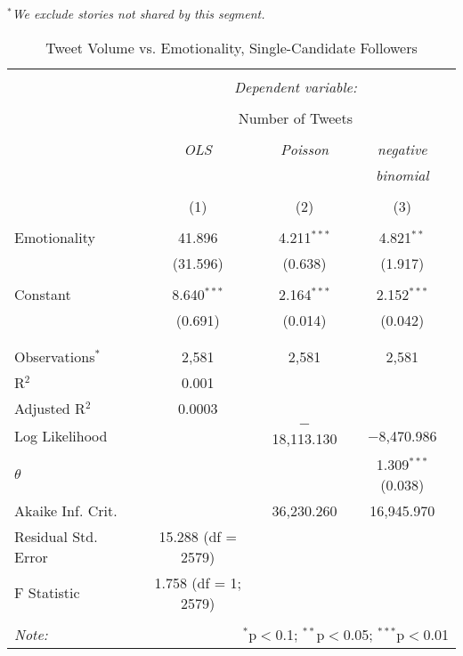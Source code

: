 \emph{$^{*}$We exclude stories not shared by this segment.} 
\newpage 
\begin{table}[!htbp] \centering 
  \caption{Tweet Volume vs. Emotionality, Single-Candidate Followers} 
  \label{} 
    \begin{tabular}{@{\extracolsep{5pt}}lccc} 
    \\[-1.8ex]\hline 
    \hline \\[-1.8ex] 
     & \multicolumn{3}{c}{\textit{Dependent variable:}} \\ 
    \cline{2-4} 
    \\[-1.8ex] & \multicolumn{3}{c}{Number of Tweets} \\ 
    \\[-1.8ex] & \textit{OLS} & \textit{Poisson} & \textit{negative} \\ 
     & \textit{} & \textit{} & \textit{binomial} \\ 
    \\[-1.8ex] & (1) & (2) & (3)\\ 
    \hline \\[-1.8ex] 
     Emotionality & 41.896 & 4.211$^{***}$ & 4.821$^{**}$ \\ 
      & (31.596) & (0.638) & (1.917) \\ 
      & & & \\ 
     Constant & 8.640$^{***}$ & 2.164$^{***}$ & 2.152$^{***}$ \\ 
      & (0.691) & (0.014) & (0.042) \\ 
      & & & \\ 
    \hline \\[-1.8ex] 
    Observations$^{*}$ & 2,581 & 2,581 & 2,581 \\ 
    R$^{2}$ & 0.001 &  &  \\ 
    Adjusted R$^{2}$ & 0.0003 &  &  \\ 
    Log Likelihood &  & $-$18,113.130 & $-$8,470.986 \\ 
    $\theta$ &  &  & 1.309$^{***}$  (0.038) \\ 
    Akaike Inf. Crit. &  & 36,230.260 & 16,945.970 \\ 
    Residual Std. Error & 15.288 (df = 2579) &  &  \\ 
    F Statistic & 1.758 (df = 1; 2579) &  &  \\ 
    \hline 
    \hline \\[-1.8ex] 
    \textit{Note:}  & \multicolumn{3}{r}{$^{*}$p$<$0.1; $^{**}$p$<$0.05; $^{***}$p$<$0.01} \\ 
    \end{tabular} 
\end{table}
